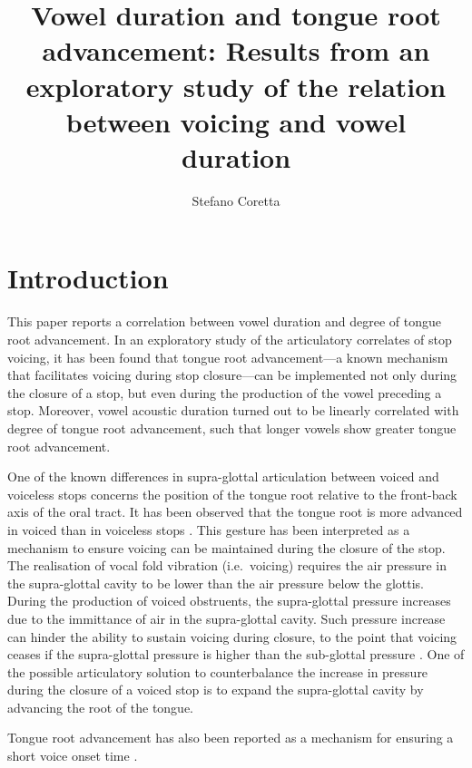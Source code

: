 \documentclass[]{article}
\title{Vowel duration and tongue root advancement: Results from an exploratory
study of the relation between voicing and vowel duration}
\author{Stefano Coretta}
\date{}
\begin{document}
\maketitle

\hypertarget{introduction}{%
\section{Introduction}\label{introduction}}

This paper reports a correlation between vowel duration and degree of
tongue root advancement. In an exploratory study of the articulatory
correlates of stop voicing, it has been found that tongue root
advancement---a known mechanism that facilitates voicing during stop
closure---can be implemented not only during the closure of a stop, but
even during the production of the vowel preceding a stop. Moreover,
vowel acoustic duration turned out to be linearly correlated with degree
of tongue root advancement, such that longer vowels show greater tongue
root advancement.

One of the known differences in supra-glottal articulation between
voiced and voiceless stops concerns the position of the tongue root
relative to the front-back axis of the oral tract. It has been observed
that the tongue root is more advanced in voiced than in voiceless stops
\citep{kent1969,perkell1969,westbury1983}. This gesture has been
interpreted as a mechanism to ensure voicing can be maintained during
the closure of the stop. The realisation of vocal fold vibration
(i.e.~voicing) requires the air pressure in the supra-glottal cavity to
be lower than the air pressure below the glottis. During the production
of voiced obstruents, the supra-glottal pressure increases due to the
immittance of air in the supra-glottal cavity. Such pressure increase
can hinder the ability to sustain voicing during closure, to the point
that voicing ceases if the supra-glottal pressure is higher than the
sub-glottal pressure \citep{ohala2011}. One of the possible articulatory
solution to counterbalance the increase in pressure during the closure
of a voiced stop is to expand the supra-glottal cavity by advancing the
root of the tongue.

Tongue root advancement has also been reported as a mechanism for
ensuring a short voice onset time \citep{ahn2016}.
\end{document}
